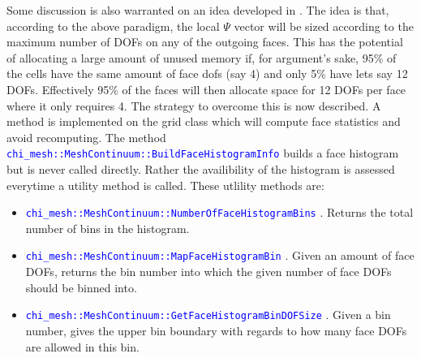 \documentclass[11pt,letterpaper,titlepage]{article}
\newcommand{\xmltag}[1]{\textcolor{blue}{ \texttt{#1}} }
\numberwithin{equation}{section}
\begin{document}
Some discussion is also warranted on an idea developed in \cite{AdamsSPDS}. The idea is that, according to the above paradigm, the local $\Psi$ vector will be sized according to the maximum number of DOFs on any of the outgoing faces. This has the potential of allocating a large amount of unused memory if, for argument's sake, 95\% of the cells have the same amount of face dofs (say 4) and only 5\% have lets say 12 DOFs. Effectively 95\% of the faces will then allocate space for 12 DOFs per face where it only requires 4. The strategy to overcome this is now described.
\newline
\newline
A method is implemented on the grid class which will compute face statistics and avoid recomputing. The method  \xmltag{chi\_mesh::MeshContinuum::BuildFaceHistogramInfo} builds a face histogram but is never called directly. Rather the availibility of the histogram is assessed everytime a utility method is called. These utlility methods are:
\begin{itemize}
\item \xmltag{chi\_mesh::MeshContinuum::NumberOfFaceHistogramBins}. Returns the total number of bins in the histogram.
\item \xmltag{chi\_mesh::MeshContinuum::MapFaceHistogramBin}. Given an amount of face DOFs, returns the bin number into which the given number of face DOFs should be binned into.
\item \xmltag{chi\_mesh::MeshContinuum::GetFaceHistogramBinDOFSize}. Given a bin number, gives the upper bin boundary with regards to how many face DOFs are allowed in this bin.
\end{itemize}
\end{document}
